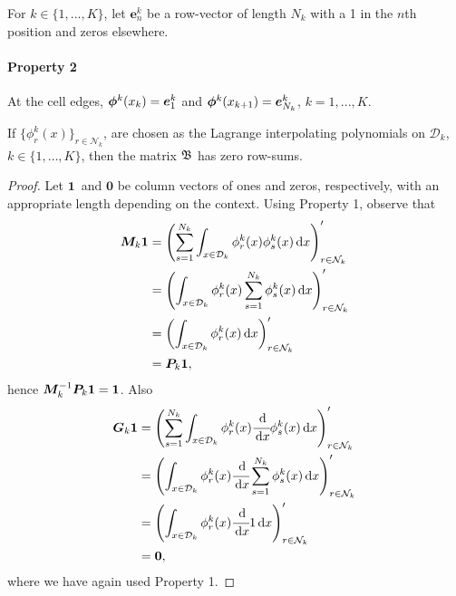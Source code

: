 	For \(k\in\{1,...,K\}\), let \(\boldsymbol e_n^k\) be a row-vector of length \(N_k\) with a 1 in the \(n\)th position and zeros elsewhere.
	\paragraph{Property 2} At the cell edges, \(\boldsymbol \phi^k(x_k) = \boldsymbol e_1^k\) and \(\boldsymbol\phi^k(x_{k+1})=\boldsymbol e_{N_k}^k\), \(k=1,...,K\). 

\begin{lem}
	If \(\{\phi_r^k(x)\}_{r\in\mathcal N_k}\), are chosen as the Lagrange interpolating polynomials on \(\mathcal D_k\), \(k\in\{1,\dots,K\}\), then the matrix \( {  {\mathfrak{\boldsymbol B}}}\) has zero row-sums. 
\end{lem}
\begin{proof}
	Let \(\boldsymbol 1\)\, and \(\boldsymbol 0\) be column vectors of ones and zeros, respectively, with an appropriate length depending on the context. Using Property 1, observe that 
	\begin{align*}
        \boldsymbol M_k\boldsymbol 1 &= \left(\sum_{s=1}^{N_k} \int_{x\in\mathcal{D}_k}\phi_r^k(x)\phi_s^k(x)\, \mathrm{d} x\right)_{r\in\mathcal N_k}'{}
        \\&= \left(\int_{x\in\mathcal{D}_k}\phi_r^k(x)\sum_{s=1}^{N_k} \phi_s^k(x)\, \mathrm{d} x \right)_{r\in\mathcal N_k} '{}
        \\&= \left(\int_{x\in\mathcal{D}_k}\phi_r^k(x)\, \mathrm{d} x\right)_{r\in\mathcal N_k} '{}
        \\&= \boldsymbol P_k\boldsymbol 1,
	\end{align*}
	hence \(\boldsymbol M_k^{-1}\boldsymbol P_k\boldsymbol 1=\boldsymbol 1\). Also 
	\begin{align*}
        \boldsymbol G_k\boldsymbol 1 &= \left(\sum_{s=1}^{N_k} \int_{x\in\mathcal{D}_k}\phi_r^k(x)\cfrac{\, \mathrm{d} }{\, \mathrm{d} x}\phi_s^k(x)\, \mathrm{d} x\right)_{r\in\mathcal N_k} '{}
        \\&= \left(\int_{x\in\mathcal{D}_k}\phi_r^k(x)\cfrac{\, \mathrm{d} }{\, \mathrm{d} x}\sum_{s=1}^{N_k} \phi_s^k(x)\, \mathrm{d} x \right)_{r\in\mathcal N_k} '{}
        \\&= \left(\int_{x\in\mathcal{D}_k}\phi_r^k(x)\cfrac{\, \mathrm{d} }{\, \mathrm{d} x}1\, \mathrm{d} x\right)_{r\in\mathcal N_k} '{}
        \\&= \boldsymbol 0,
	\end{align*}
	where we have again used Property 1. 
	

\end{proof}
